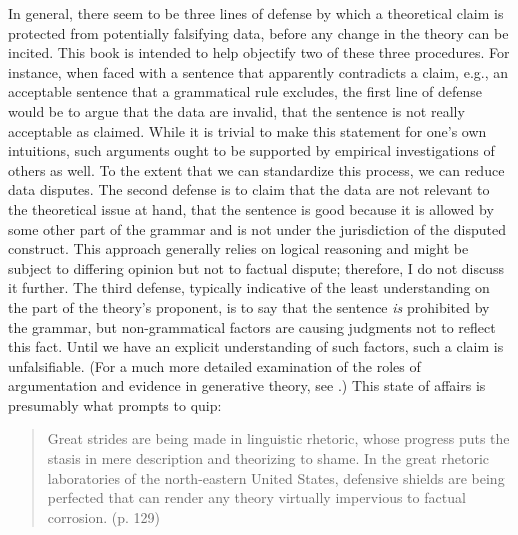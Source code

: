 In general, there seem to be three lines of defense by which a theoretical claim is protected from potentially falsifying data, before any change in the theory can be incited. This book is intended to help objectify two of these three procedures. For instance, when faced with a sentence that apparently contradicts a claim, e.g., an acceptable sentence that a grammatical rule excludes, the first line
of defense would be to argue that the data are invalid, that the sentence is not really acceptable as claimed. While it is trivial to make this statement for one's own intuitions, such arguments ought to be supported by empirical investigations of others as well. To the extent that we can standardize this process, we can reduce data disputes. The second defense is to claim that the data are not relevant to the theoretical issue at hand, that the sentence is good because it is allowed by some other part of the grammar and is not under the jurisdiction of the disputed construct. This approach generally relies on logical reasoning and might be subject to differing opinion but not to factual dispute; therefore, I do not discuss it further. The third defense, typically indicative of the least understanding on the part of the theory's proponent, is to say that the sentence \textit{is} prohibited by the grammar, but non-grammatical factors are causing judgments not to reflect this fact. Until we have an explicit understanding of such factors, such a claim is unfalsifiable. (For a much more detailed examination of the roles of argumentation and evidence in generative theory, see \citealt{Botha1973}.) This state of affairs is presumably what prompts \citet{Postal1988} to quip:

\begin{quote}
Great strides are being made in linguistic rhetoric, whose progress puts the stasis in mere description and theorizing to shame. In the great rhetoric laboratories of the north-eastern United States, defensive shields are being perfected that can render any theory virtually impervious to factual corrosion. (p. 129)
\end{quote}

